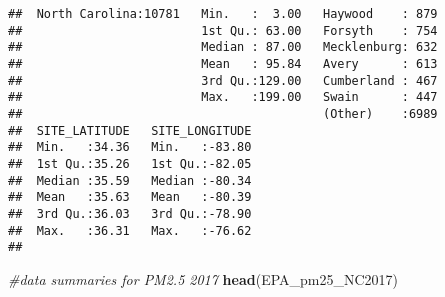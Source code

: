 \documentclass[]{article}
\newenvironment{Shaded}{\begin{snugshade}}{\end{snugshade}}
\newcommand{\KeywordTok}[1]{\textcolor[rgb]{0.13,0.29,0.53}{\textbf{#1}}}
\newcommand{\CommentTok}[1]{\textcolor[rgb]{0.56,0.35,0.01}{\textit{#1}}}
\newcommand{\NormalTok}[1]{#1}
\begin{document}
\begin{verbatim}
##  North Carolina:10781   Min.   :  3.00   Haywood    : 879  
##                         1st Qu.: 63.00   Forsyth    : 754  
##                         Median : 87.00   Mecklenburg: 632  
##                         Mean   : 95.84   Avery      : 613  
##                         3rd Qu.:129.00   Cumberland : 467  
##                         Max.   :199.00   Swain      : 447  
##                                          (Other)    :6989  
##  SITE_LATITUDE   SITE_LONGITUDE  
##  Min.   :34.36   Min.   :-83.80  
##  1st Qu.:35.26   1st Qu.:-82.05  
##  Median :35.59   Median :-80.34  
##  Mean   :35.63   Mean   :-80.39  
##  3rd Qu.:36.03   3rd Qu.:-78.90  
##  Max.   :36.31   Max.   :-76.62  
## 
\end{verbatim}

\begin{Shaded}
\begin{Highlighting}[]
\CommentTok{#data summaries for PM2.5 2017}
\KeywordTok{head}\NormalTok{(EPA_pm25_NC2017)}
\end{Highlighting}
\end{Shaded}
\end{document}
